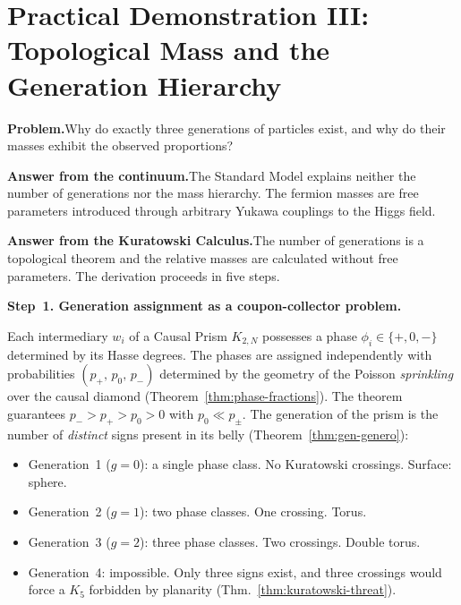 \bigskip

\section*{Practical Demonstration III: Topological Mass
  and the Generation Hierarchy}
\label{sec:demo-mass}

\noindent\textbf{Problem.}\enspace Why do exactly three generations of
particles exist, and why do their masses exhibit the observed
proportions?

\noindent\textbf{Answer from the continuum.}\enspace The Standard Model
explains neither the number of generations nor the mass hierarchy. The
fermion masses are free parameters introduced through arbitrary Yukawa
couplings to the Higgs field.

\noindent\textbf{Answer from the Kuratowski Calculus.}\enspace The
number of generations is a topological theorem and the relative masses
are calculated without free parameters. The derivation proceeds in five
steps.

\bigskip
\noindent
\textbf{Step~1. Generation assignment as a coupon-collector problem.}

Each intermediary $w_i$ of a Causal Prism $K_{2,N}$ possesses a phase
$\phi_i \in \{+, 0, -\}$ determined by its Hasse degrees. The phases
are assigned independently with probabilities
$(p_+,\, p_0,\, p_-)$ determined by the geometry of the Poisson
\emph{sprinkling} over the causal diamond
(Theorem~\ref{thm:phase-fractions}). The theorem guarantees
$p_- > p_+ > p_0 > 0$ with $p_0 \ll p_\pm$.
The generation of the prism is the number of \emph{distinct} signs
present in its belly (Theorem~\ref{thm:gen-genero}):
\begin{itemize}
  \item Generation~1 ($g = 0$): a single phase class. No Kuratowski
        crossings. Surface: sphere.
  \item Generation~2 ($g = 1$): two phase classes. One crossing. Torus.
  \item Generation~3 ($g = 2$): three phase classes. Two crossings.
        Double torus.
  \item Generation~4: impossible. Only three signs exist, and three
        crossings would force a $K_5$ forbidden by planarity
        (Thm.~\ref{thm:kuratowski-threat}).
\end{itemize}

